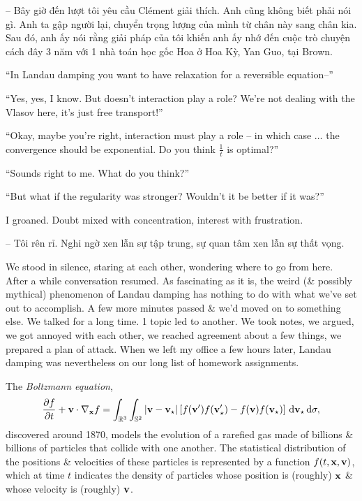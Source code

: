 \documentclass{article}
\begin{document}
\begin{enumerate}
	-- Bây giờ đến lượt tôi yêu cầu Cl\'ement giải thích. Anh cũng không biết phải nói gì. Anh ta gập người lại, chuyển trọng lượng của mình từ chân này sang chân kia. Sau đó, anh ấy nói rằng giải pháp của tôi khiến anh ấy nhớ đến cuộc trò chuyện cách đây 3 năm với 1 nhà toán học gốc Hoa ở Hoa Kỳ, Yan Guo, tại Brown.

	``In Landau damping you want to have relaxation for a reversible equation--''

	``Yes, yes, I know. But doesn't interaction play a role? We're not dealing with the Vlasov here, it's just free transport!''

	``Okay, maybe you're right, interaction must play a role -- in which case $\ldots$ the convergence should be exponential. Do you think $\frac{1}{t}$ is optimal?''

	``Sounds right to me. What do you think?''

	``But what if the regularity was stronger? Wouldn't it be better if it was?''

	I groaned. Doubt mixed with concentration, interest with frustration.

	-- Tôi rên rỉ. Nghi ngờ xen lẫn sự tập trung, sự quan tâm xen lẫn sự thất vọng.

	We stood in silence, staring at each other, wondering where to go from here. After a while conversation resumed. As fascinating as it is, the weird (\& possibly mythical) phenomenon of Landau damping has nothing to do with what we've set out to accomplish. A few more minutes passed \& we'd moved on to something else. We talked for a long time. 1 topic led to another. We took notes, we argued, we got annoyed with each other, we reached agreement about a few things, we prepared a plan of attack. When we left my office a few hours later, Landau damping was nevertheless on our long list of homework assignments.

	The {\it Boltzmann equation},
	\begin{equation*}
		\frac{\partial f}{\partial t} + {\bf v}\cdot\nabla_{\bf x}f = \int_{\mathbb{R}^3}\int_{\mathbb{S}^2} |{\bf v} - {\bf v}_\star|\left[f({\bf v}')f({\bf v}_\star') - f({\bf v})f({\bf v}_\star)\right]\,{\rm d}{\bf v}_\star\,{\rm d}\sigma,
	\end{equation*}
	discovered around 1870, models the evolution of a rarefied gas made of billions \& billions of particles that collide with one another. The statistical distribution of the positions \& velocities of these particles is represented by a function $f(t,{\bf x},{\bf v})$, which at time $t$ indicates the density of particles whose position is (roughly) $\bf x$ \& whose velocity is (roughly) $\bf v$.


\end{enumerate}
\end{document}
